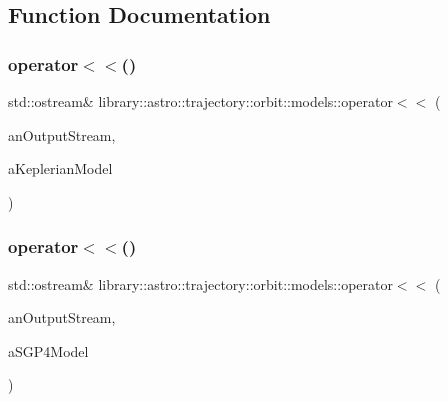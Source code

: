 \subsection{Function Documentation}
\mbox{\label{namespacelibrary_1_1astro_1_1trajectory_1_1orbit_1_1models_add30984ea41b81d41ec9eaccededb02b}} 
\subsubsection{\texorpdfstring{operator$<$$<$()}{operator<<()}\hspace{0.1cm}{\footnotesize\ttfamily [1/2]}}
{\footnotesize\ttfamily std\+::ostream\& library\+::astro\+::trajectory\+::orbit\+::models\+::operator$<$$<$ (\begin{DoxyParamCaption}\item[{std\+::ostream \&}]{an\+Output\+Stream,  }\item[{const \hyperlink{classlibrary_1_1astro_1_1trajectory_1_1orbit_1_1models_1_1_kepler}{Kepler} \&}]{a\+Keplerian\+Model }\end{DoxyParamCaption})}

\mbox{\label{namespacelibrary_1_1astro_1_1trajectory_1_1orbit_1_1models_afdb7df09fa31e9fa56cecb5b23a3c08f}} 
\subsubsection{\texorpdfstring{operator$<$$<$()}{operator<<()}\hspace{0.1cm}{\footnotesize\ttfamily [2/2]}}
{\footnotesize\ttfamily std\+::ostream\& library\+::astro\+::trajectory\+::orbit\+::models\+::operator$<$$<$ (\begin{DoxyParamCaption}\item[{std\+::ostream \&}]{an\+Output\+Stream,  }\item[{const \hyperlink{classlibrary_1_1astro_1_1trajectory_1_1orbit_1_1models_1_1_s_g_p4}{S\+G\+P4} \&}]{a\+S\+G\+P4\+Model }\end{DoxyParamCaption})}

